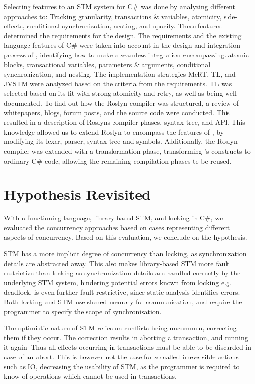Selecting features to an \ac{STM} system for C\# was done by analyzing different approaches to: Tracking granularity, transactions \& variables, atomicity, side-effects, conditional synchronization, nesting, and opacity. These features determined the requirements for the design. The requirements and the existing language features of C\# were taken into account in the design and integration process of \stmname, identifying how to make a seamless integration encompassing: atomic blocks, transactional variables, parameters \& arguments, conditional synchronization, and nesting. The implementation strategies McRT, TL, and JVSTM were analyzed based on the criteria from the requirements. TL was selected based on its fit with strong atomicity and retry, as well as being well documented. To find out how the Roslyn compiler was structured, a review of whitepapers, blogs, forum posts, and the source code were conducted. This resulted in a description of Roslyns compiler phases, syntax tree, and \ac{API}. This knowledge allowed us to extend Roslyn to encompass the features of \stmname, by modifying its lexer, parser, syntax tree and symbols. Additionally, the Roslyn compiler was extended with a transformation phase, transforming \stmname's constructs to ordinary C\# code, allowing the remaining compilation phases to be reused.

\section{Hypothesis Revisited}
With a functioning \stmname language, library based \ac{STM}, and locking in C\#, we evaluated the concurrency approaches based on cases representing different aspects of concurrency. Based on this evaluation, we conclude on the hypothesis.

\ac{STM} has a more implicit degree of concurrency than locking, as synchronization details are abstracted away. This also makes library-based \ac{STM} more fault restrictive than locking as synchronization details are handled correctly by the underlying \ac{STM} system, hindering potential errors known from locking e.g. deadlock. \stmname is even further fault restrictive, since static analysis identifies errors. Both locking and \ac{STM} use shared memory for communication, and require the programmer to specify the scope of synchronization.

The optimistic nature of \ac{STM} relies on conflicts being uncommon,  correcting them if they occur. The correction results in aborting a transaction, and running it again. Thus all effects occurring in transactions must be able to be discarded in case of an abort. This is however not the case for so called irreversible actions such as \ac{IO},  decreasing the usability of \ac{STM}, as the programmer is required to know of operations which cannot be used in transactions.

